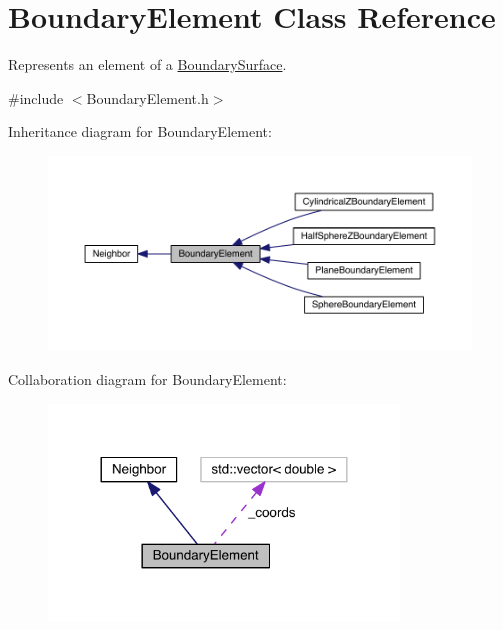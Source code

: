\hypertarget{classBoundaryElement}{\section{Boundary\+Element Class Reference}
\label{classBoundaryElement}
}


Represents an element of a \hyperlink{classBoundarySurface}{Boundary\+Surface}.  




{\ttfamily \#include $<$Boundary\+Element.\+h$>$}



Inheritance diagram for Boundary\+Element\+:
\nopagebreak
\begin{figure}[H]
\begin{center}
\leavevmode
\includegraphics[width=350pt]{classBoundaryElement__inherit__graph}
\end{center}
\end{figure}


Collaboration diagram for Boundary\+Element\+:\nopagebreak
\begin{figure}[H]
\begin{center}
\leavevmode
\includegraphics[width=264pt]{classBoundaryElement__coll__graph}
\end{center}
\end{figure}
